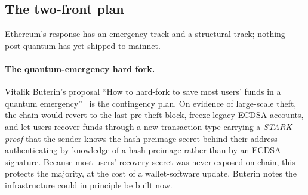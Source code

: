 \subsection{The two-front plan}
\label{sec:eth-two-front}
Ethereum's response has an emergency track and a structural track; nothing post-quantum has yet shipped to mainnet.

\paragraph{The quantum-emergency hard fork.}
Vitalik Buterin's proposal ``How to hard-fork to save most users' funds in a quantum emergency''~\cite{buterinquantum2024} is the contingency plan. On evidence of large-scale theft, the chain would revert to the last pre-theft block, freeze legacy ECDSA accounts, and let users recover funds through a new transaction type carrying a \emph{STARK proof} that the sender knows the hash preimage secret behind their address -- authenticating by knowledge of a hash preimage rather than by an ECDSA signature. Because most users' recovery secret was never exposed on chain, this protects the majority, at the cost of a wallet-software update. Buterin notes the infrastructure could in principle be built now.

